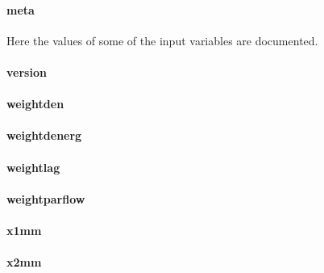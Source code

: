 \paragraph{meta}
Here the values of some of the input variables are documented.

\paragraph{version}

\paragraph{weightden}

\paragraph{weightdenerg}

\paragraph{weightlag}

\paragraph{weightparflow}

\paragraph{x1mm}

\paragraph{x2mm}
